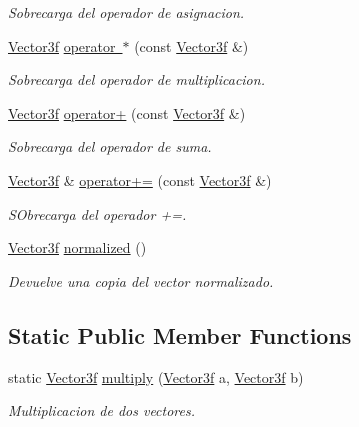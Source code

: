 \begin{DoxyCompactItemize}
\begin{DoxyCompactList}\small\item\em Sobrecarga del operador de asignacion. \end{DoxyCompactList}\item 
\mbox{\hyperlink{structmathexp_1_1_vector3f}{Vector3f}} \mbox{\hyperlink{structmathexp_1_1_vector3f_aded79f82d971ef0abfc8c521f732aec8}{operator $\ast$}} (const \mbox{\hyperlink{structmathexp_1_1_vector3f}{Vector3f}} \&)
\begin{DoxyCompactList}\small\item\em Sobrecarga del operador de multiplicacion. \end{DoxyCompactList}\item 
\mbox{\hyperlink{structmathexp_1_1_vector3f}{Vector3f}} \mbox{\hyperlink{structmathexp_1_1_vector3f_a636ba939722da9cc20bb583322305f66}{operator+}} (const \mbox{\hyperlink{structmathexp_1_1_vector3f}{Vector3f}} \&)
\begin{DoxyCompactList}\small\item\em Sobrecarga del operador de suma. \end{DoxyCompactList}\item 
\mbox{\hyperlink{structmathexp_1_1_vector3f}{Vector3f}} \& \mbox{\hyperlink{structmathexp_1_1_vector3f_a14d6396a9c8ebd2b27f8ad3d0f588795}{operator+=}} (const \mbox{\hyperlink{structmathexp_1_1_vector3f}{Vector3f}} \&)
\begin{DoxyCompactList}\small\item\em S\+Obrecarga del operador +=. \end{DoxyCompactList}\item 
\mbox{\hyperlink{structmathexp_1_1_vector3f}{Vector3f}} \mbox{\hyperlink{structmathexp_1_1_vector3f_a6ecf77a8fb0cd21fc14f07f32c48612d}{normalized}} ()
\begin{DoxyCompactList}\small\item\em Devuelve una copia del vector normalizado. \end{DoxyCompactList}\end{DoxyCompactItemize}
\subsection*{Static Public Member Functions}
\begin{DoxyCompactItemize}
\item 
static \mbox{\hyperlink{structmathexp_1_1_vector3f}{Vector3f}} \mbox{\hyperlink{structmathexp_1_1_vector3f_ae7ce33c088faa2d6847c7d6fa3fd891b}{multiply}} (\mbox{\hyperlink{structmathexp_1_1_vector3f}{Vector3f}} a, \mbox{\hyperlink{structmathexp_1_1_vector3f}{Vector3f}} b)
\begin{DoxyCompactList}\small\item\em Multiplicacion de dos vectores. \end{DoxyCompactList}\end{DoxyCompactItemize}
